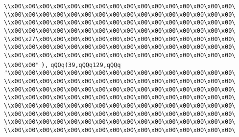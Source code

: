 \verb|\\x00\x00\x00\x00\x00\x00\x00\x00\x00\x00\x00\x00\x00\x00\x00\x00\|\newline
\verb|\\x00\x00\x00\x00\x00\x00\x00\x00\x00\x00\x00\x00\x00\x00\x00\x00\|\newline
\verb|\\x00\x00\x00\x00\x00\x00\x00\x00\x00\x00\x00\x00\x00\x00\x00\x00\|\newline
\verb|\\x00\x00\x00\x00\x00\x00\x00\x00\x00\x00\x00\x00\x00\x00\x00\x00\|\newline
\verb|\\x00\x27\x00\x00\x00\x00\x00\x00\x00\x00\x00\x00\x00\x00\x00\x00\|\newline
\verb|\\x00\x00\x00\x00\x00\x00\x00\x00\x00\x00\x00\x00\x00\x00\x00\x00\|\newline
\verb|\\x00\x00\x00\x00\x00\x00\x00\x00\x00\x00\x00\x00\x00\x00\x00\x00\|\newline
\verb|\\x00\x00"|\newline
\verb|),|\newline
\verb|qQQq(39,qQQq129,qQQq|\newline
\verb|"\x00\x00\x00\x00\x00\x00\x00\x00\x00\x00\x00\x00\x00\x00\x00\x00\|\newline
\verb|\\x00\x00\x00\x00\x00\x00\x00\x00\x00\x00\x00\x00\x00\x00\x00\x00\|\newline
\verb|\\x00\x00\x00\x00\x00\x00\x00\x00\x00\x00\x00\x00\x00\x00\x00\x00\|\newline
\verb|\\x00\x00\x00\x00\x00\x00\x00\x00\x00\x00\x00\x00\x00\x00\x00\x00\|\newline
\verb|\\x00\x00\x00\x00\x00\x00\x00\x00\x00\x00\x00\x00\x00\x00\x00\x00\|\newline
\verb|\\x00\x00\x00\x00\x00\x00\x00\x00\x00\x00\x00\x00\x00\x00\x00\x00\|\newline
\verb|\\x00\x00\x00\x00\x00\x00\x00\x00\x00\x00\x00\x00\x00\x00\x00\x00\|\newline
\verb|\\x00\x00\x00\x00\x00\x00\x00\x00\x00\x00\x00\x00\x00\x00\x00\x00\|\newline
